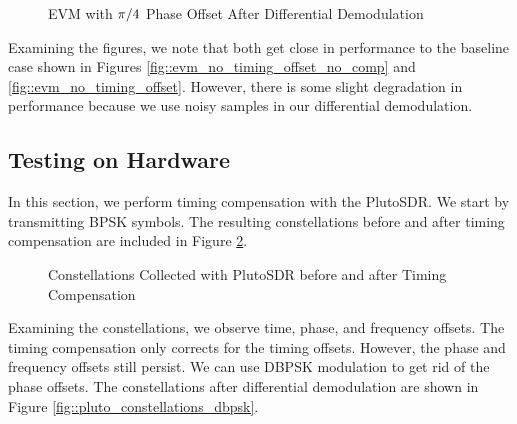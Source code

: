 \documentclass{article}
\begin{document}
\begin{figure}[H]
	\centerline{}
	\caption{EVM with $\protect\pi/4$ Phase Offset After Differential Demodulation}
	\label{fig::evm_dpsk_modulation}
\end{figure}

\noindent Examining the figures, we note that both get close in performance to the baseline case shown in Figures \ref{fig::evm_no_timing_offset_no_comp} and \ref{fig::evm_no_timing_offset}. However, there is some slight degradation in performance because we use noisy samples in our differential demodulation. 

\subsection{Testing on Hardware}

In this section, we perform timing compensation with the PlutoSDR. We start by transmitting BPSK symbols. The resulting constellations before and after timing compensation are included in Figure \ref{fig::pluto_constellations_no_comp}.

\begin{figure}[H]
	\centerline{}
	\caption{Constellations Collected with PlutoSDR before and after Timing Compensation}
	\label{fig::pluto_constellations_no_comp}
\end{figure}

\noindent Examining the constellations, we observe time, phase, and frequency offsets. The timing compensation only corrects for the timing offsets. However, the phase and frequency offsets still persist. We can use DBPSK modulation to get rid of the phase offsets. The constellations after differential demodulation are shown in Figure \ref{fig::pluto_constellations_dbpsk}.
\end{document}
